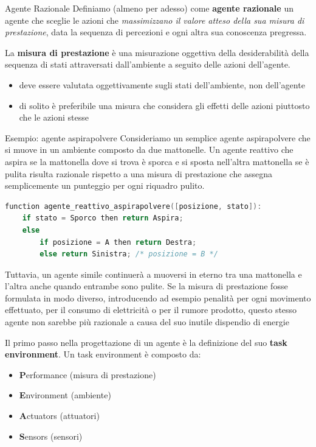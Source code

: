 \documentclass[a4paper,11pt]{report}
\begin{document}
\begin{defframe}{Agente Razionale}{}
    Definiamo (almeno per adesso) come \textbf{agente razionale} un agente che sceglie le azioni che \textit{massimizzano il valore atteso della sua misura di prestazione}, data la sequenza di percezioni e ogni altra sua conoscenza pregressa.

    La \textbf{misura di prestazione} è una misurazione oggettiva della desiderabilità della sequenza di stati attraversati dall'ambiente a seguito delle azioni dell'agente.
    \begin{itemize}
        \item deve essere valutata oggettivamente sugli stati dell'ambiente, non dell'agente
        \item di solito è preferibile una misura che considera gli effetti delle azioni piuttosto che le azioni stesse
    \end{itemize}
\end{defframe}

\begin{gframe}{Esempio: agente aspirapolvere}
    Consideriamo un semplice agente aspirapolvere che si muove in un ambiente composto da due mattonelle. Un agente reattivo che aspira se la mattonella dove si trova è sporca e si sposta nell'altra mattonella se è pulita risulta razionale rispetto a una misura di prestazione che assegna semplicemente un punteggio per ogni riquadro pulito.
    \begin{lstlisting}[language=C]
function agente_reattivo_aspirapolvere([posizione, stato]):
    if stato = Sporco then return Aspira;
    else
        if posizione = A then return Destra;
        else return Sinistra; /* posizione = B */
\end{lstlisting}
    Tuttavia, un agente simile continuerà a muoversi in eterno tra una mattonella e l'altra anche quando entrambe sono pulite. 
    Se la misura di prestazione fosse formulata in modo diverso, introducendo ad esempio penalità per ogni movimento effettuato, per il consumo di elettricità o per il rumore prodotto, questo stesso agente non sarebbe più razionale a causa del suo inutile dispendio di energie
\end{gframe}

Il primo passo nella progettazione di un agente è la definizione del suo \textbf{task environment}.
Un task environment è composto da:
    \begin{itemize}
        \item \textbf{P}erformance (misura di prestazione) 
        \item \textbf{E}nvironment (ambiente) 
        \item \textbf{A}ctuators (attuatori) 
        \item \textbf{S}ensors (sensori) 
    \end{itemize}
\end{document}
